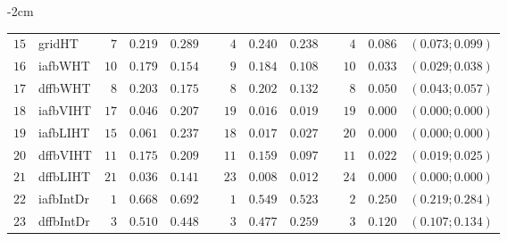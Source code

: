 \begin{table*}[!htbp]
\begin{adjustwidth*}{}{-2cm}
\begin{tabular}{@{}rlrrrrrrrrrcc@{}}
\footnotesize{$15$} & \footnotesize{gridHT   } & \footnotesize{$7 $} & \footnotesize{$0.219$} & \footnotesize{$0.289$} && \footnotesize{$4 $} & \footnotesize{$0.240$} & \footnotesize{$0.238$} && \footnotesize{$4 $} & \footnotesize{$0.086$} & \footnotesize{$(0.073;0.099)$} \\
\footnotesize{$16$} & \footnotesize{iafbWHT  } & \footnotesize{$10$} & \footnotesize{$0.179$} & \footnotesize{$0.154$} && \footnotesize{$9 $} & \footnotesize{$0.184$} & \footnotesize{$0.108$} && \footnotesize{$10$} & \footnotesize{$0.033$} & \footnotesize{$(0.029;0.038)$} \\
\footnotesize{$17$} & \footnotesize{dffbWHT  } & \footnotesize{$8 $} & \footnotesize{$0.203$} & \footnotesize{$0.175$} && \footnotesize{$8 $} & \footnotesize{$0.202$} & \footnotesize{$0.132$} && \footnotesize{$8 $} & \footnotesize{$0.050$} & \footnotesize{$(0.043;0.057)$} \\
\footnotesize{$18$} & \footnotesize{iafbVIHT } & \footnotesize{$17$} & \footnotesize{$0.046$} & \footnotesize{$0.207$} && \footnotesize{$19$} & \footnotesize{$0.016$} & \footnotesize{$0.019$} && \footnotesize{$19$} & \footnotesize{$0.000$} & \footnotesize{$(0.000;0.000)$} \\
\footnotesize{$19$} & \footnotesize{iafbLIHT } & \footnotesize{$15$} & \footnotesize{$0.061$} & \footnotesize{$0.237$} && \footnotesize{$18$} & \footnotesize{$0.017$} & \footnotesize{$0.027$} && \footnotesize{$20$} & \footnotesize{$0.000$} & \footnotesize{$(0.000;0.000)$} \\
\footnotesize{$20$} & \footnotesize{dffbVIHT } & \footnotesize{$11$} & \footnotesize{$0.175$} & \footnotesize{$0.209$} && \footnotesize{$11$} & \footnotesize{$0.159$} & \footnotesize{$0.097$} && \footnotesize{$11$} & \footnotesize{$0.022$} & \footnotesize{$(0.019;0.025)$} \\
\footnotesize{$21$} & \footnotesize{dffbLIHT } & \footnotesize{$21$} & \footnotesize{$0.036$} & \footnotesize{$0.141$} && \footnotesize{$23$} & \footnotesize{$0.008$} & \footnotesize{$0.012$} && \footnotesize{$24$} & \footnotesize{$0.000$} & \footnotesize{$(0.000;0.000)$} \\
\footnotesize{$22$} & \footnotesize{iafbIntDr} & \footnotesize{$1 $} & \footnotesize{$0.668$} & \footnotesize{$0.692$} && \footnotesize{$1 $} & \footnotesize{$0.549$} & \footnotesize{$0.523$} && \footnotesize{$2 $} & \footnotesize{$0.250$} & \footnotesize{$(0.219;0.284)$} \\
\footnotesize{$23$} & \footnotesize{dffbIntDr} & \footnotesize{$3 $} & \footnotesize{$0.510$} & \footnotesize{$0.448$} && \footnotesize{$3 $} & \footnotesize{$0.477$} & \footnotesize{$0.259$} && \footnotesize{$3 $} & \footnotesize{$0.120$} & \footnotesize{$(0.107;0.134)$} \\

\end{tabular}
\end{adjustwidth*}
\end{table*}
